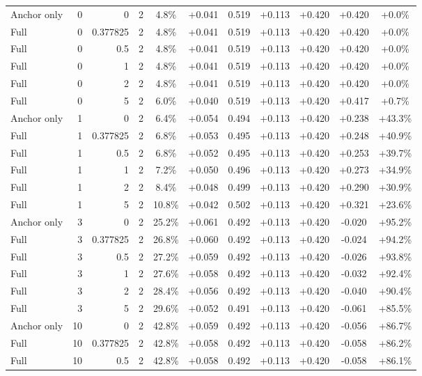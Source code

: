 \begin{table}[htbp]
\begin{tabular}{lrrrccccccc}
Anchor only & 0 & 0 & 2 & 4.8\% & +0.041 & 0.519 & +0.113 & +0.420 & +0.420 & +0.0\% \\
Full & 0 & 0.377825 & 2 & 4.8\% & +0.041 & 0.519 & +0.113 & +0.420 & +0.420 & +0.0\% \\
Full & 0 & 0.5 & 2 & 4.8\% & +0.041 & 0.519 & +0.113 & +0.420 & +0.420 & +0.0\% \\
Full & 0 & 1 & 2 & 4.8\% & +0.041 & 0.519 & +0.113 & +0.420 & +0.420 & +0.0\% \\
Full & 0 & 2 & 2 & 4.8\% & +0.041 & 0.519 & +0.113 & +0.420 & +0.420 & +0.0\% \\
Full & 0 & 5 & 2 & 6.0\% & +0.040 & 0.519 & +0.113 & +0.420 & +0.417 & +0.7\% \\
Anchor only & 1 & 0 & 2 & 6.4\% & +0.054 & 0.494 & +0.113 & +0.420 & +0.238 & +43.3\% \\
Full & 1 & 0.377825 & 2 & 6.8\% & +0.053 & 0.495 & +0.113 & +0.420 & +0.248 & +40.9\% \\
Full & 1 & 0.5 & 2 & 6.8\% & +0.052 & 0.495 & +0.113 & +0.420 & +0.253 & +39.7\% \\
Full & 1 & 1 & 2 & 7.2\% & +0.050 & 0.496 & +0.113 & +0.420 & +0.273 & +34.9\% \\
Full & 1 & 2 & 2 & 8.4\% & +0.048 & 0.499 & +0.113 & +0.420 & +0.290 & +30.9\% \\
Full & 1 & 5 & 2 & 10.8\% & +0.042 & 0.502 & +0.113 & +0.420 & +0.321 & +23.6\% \\
Anchor only & 3 & 0 & 2 & 25.2\% & +0.061 & 0.492 & +0.113 & +0.420 & -0.020 & +95.2\% \\
Full & 3 & 0.377825 & 2 & 26.8\% & +0.060 & 0.492 & +0.113 & +0.420 & -0.024 & +94.2\% \\
Full & 3 & 0.5 & 2 & 27.2\% & +0.059 & 0.492 & +0.113 & +0.420 & -0.026 & +93.8\% \\
Full & 3 & 1 & 2 & 27.6\% & +0.058 & 0.492 & +0.113 & +0.420 & -0.032 & +92.4\% \\
Full & 3 & 2 & 2 & 28.4\% & +0.056 & 0.492 & +0.113 & +0.420 & -0.040 & +90.4\% \\
Full & 3 & 5 & 2 & 29.6\% & +0.052 & 0.491 & +0.113 & +0.420 & -0.061 & +85.5\% \\
Anchor only & 10 & 0 & 2 & 42.8\% & +0.059 & 0.492 & +0.113 & +0.420 & -0.056 & +86.7\% \\
Full & 10 & 0.377825 & 2 & 42.8\% & +0.058 & 0.492 & +0.113 & +0.420 & -0.058 & +86.2\% \\
Full & 10 & 0.5 & 2 & 42.8\% & +0.058 & 0.492 & +0.113 & +0.420 & -0.058 & +86.1\% \\

\end{tabular}
\end{table}
